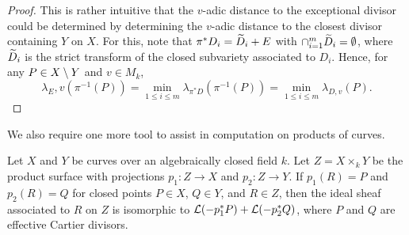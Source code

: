 \begin{proof}
This is rather intuitive that the $v$-adic distance to the exceptional divisor could be determined by determining the $v$-adic distance to the closest divisor containing $Y$ on $X$.
For this, note that $\pi^* D_i = \widetilde D_i + E$ with $\cap_{i = 1}^m \widetilde D_i = \emptyset$, 
where $\widetilde D_i$ is the strict transform of the closed subvariety associated to $D_i$. 
Hence, for any $P \in X \setminus Y$ and $v \in M_k$,
\[
    \lambda_E,v(\pi^{-1}(P))
        = \min_{1 \leq i \leq m} \lambda_{\pi^* D}(\pi^{-1}(P))
        = \min_{1 \leq i \leq m} \lambda_{D, v}(P).
\]
    
\end{proof}

We also require one more tool to assist in computation on products of curves.

\begin{lemma}
    Let $X$ and $Y$ be curves over an algebraically closed field $k$.
    Let $Z = X \times_k Y$ be the product surface with projections $p_1 : Z \to X$ and $p_2 : Z \to Y$.
    If $p_1(R) = P$ and $p_2(R) = Q$ for closed points $P \in X$, $Q \in Y$, and $R \in Z$,
    then the ideal sheaf associated to $R$ on $Z$ is isomorphic to $\mathcal{L}(-p_1^*P) + \mathcal{L}(-p_2^*Q)$,
    where $P$ and $Q$ are effective Cartier divisors.
\end{lemma}

